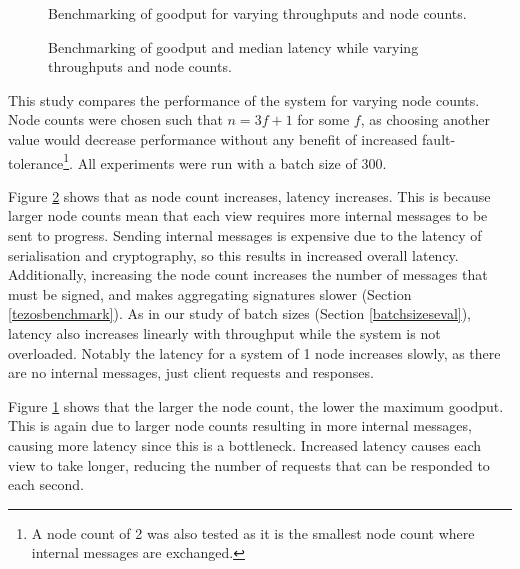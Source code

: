 \begin{figure}[h!]
\centering

\caption{Benchmarking of goodput for varying throughputs and node counts.}
\label{throughputgoodputnodes}
\end{figure}

\begin{figure}[h!]
\centering

\caption{Benchmarking of goodput and median latency while varying throughputs and node counts.}
\label{goodputlatencynodes}
\end{figure}

% 

This study compares the performance of the system for varying node counts. Node counts were chosen such that $n = 3f + 1$ for some $f$, as choosing another value would decrease performance without any benefit of increased fault-tolerance\footnote{A node count of 2 was also tested as it is the smallest node count where internal messages are exchanged.}. All experiments were run with a batch size of 300.

Figure \ref{goodputlatencynodes} shows that as node count increases, latency increases. This is because larger node counts mean that each view requires more internal messages to be sent to progress. Sending internal messages is expensive due to the latency of serialisation and cryptography, so this results in increased overall latency. Additionally, increasing the node count increases the number of messages that must be signed, and makes aggregating signatures slower (Section \ref{tezosbenchmark}). As in our study of batch sizes (Section \ref{batchsizeseval}), latency also increases linearly with throughput while the system is not overloaded. Notably the latency for a system of 1 node increases slowly, as there are no internal messages, just client requests and responses.

Figure \ref{throughputgoodputnodes} shows that the larger the node count, the lower the maximum goodput. This is again due to larger node counts resulting in more internal messages, causing more latency since this is a bottleneck. Increased latency causes each view to take longer, reducing the number of requests that can be responded to each second.


